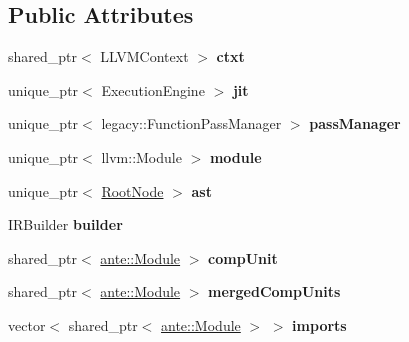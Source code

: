 \subsection*{Public Attributes}
\begin{DoxyCompactItemize}
\item 
\mbox{\label{structante_1_1Compiler_a5a5e771f1ce2e1e208cfe1fdaced2961}} 
shared\+\_\+ptr$<$ L\+L\+V\+M\+Context $>$ {\bfseries ctxt}
\item 
\mbox{\label{structante_1_1Compiler_a438a7c3c856f14f5635eca6cb4839f4f}} 
unique\+\_\+ptr$<$ Execution\+Engine $>$ {\bfseries jit}
\item 
\mbox{\label{structante_1_1Compiler_a855bf32f0712fb34f4645a06e5b0e86b}} 
unique\+\_\+ptr$<$ legacy\+::\+Function\+Pass\+Manager $>$ {\bfseries pass\+Manager}
\item 
\mbox{\label{structante_1_1Compiler_af317c2ed51789ef09b871dfbec6a9510}} 
unique\+\_\+ptr$<$ llvm\+::\+Module $>$ {\bfseries module}
\item 
\mbox{\label{structante_1_1Compiler_aa23130b28d7aa85ab37cecf42dd92611}} 
unique\+\_\+ptr$<$ \hyperlink{structRootNode}{Root\+Node} $>$ {\bfseries ast}
\item 
\mbox{\label{structante_1_1Compiler_a78073a4fb0d848f88eff1c868cab3736}} 
I\+R\+Builder {\bfseries builder}
\item 
\mbox{\label{structante_1_1Compiler_a903a2eb91408455da74676cf7ddd5282}} 
shared\+\_\+ptr$<$ \hyperlink{structante_1_1Module}{ante\+::\+Module} $>$ {\bfseries comp\+Unit}
\item 
\mbox{\label{structante_1_1Compiler_a150c8e9e49e230dcbb886d5392a90175}} 
shared\+\_\+ptr$<$ \hyperlink{structante_1_1Module}{ante\+::\+Module} $>$ {\bfseries merged\+Comp\+Units}
\item 
\mbox{\label{structante_1_1Compiler_a81474059e4354d8c2acfba816205eead}} 
vector$<$ shared\+\_\+ptr$<$ \hyperlink{structante_1_1Module}{ante\+::\+Module} $>$ $>$ {\bfseries imports}

\end{DoxyCompactItemize}
